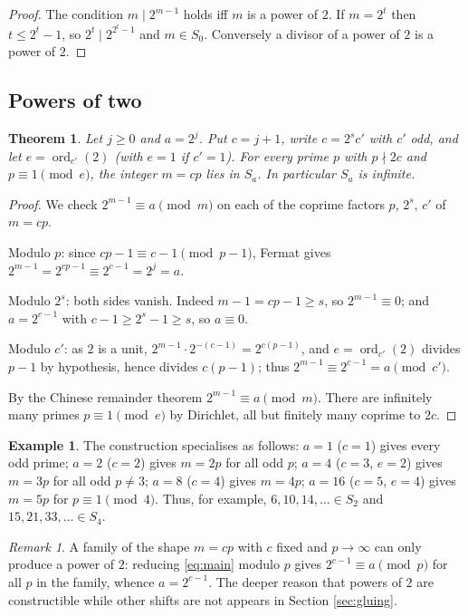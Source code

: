 \documentclass[11pt,reqno]{amsart}
\theoremstyle{plain}
\newtheorem{theorem}{Theorem}
\theoremstyle{definition}
\newtheorem{example}{Example}
\theoremstyle{remark}
\newtheorem{remark}{Remark}
\newcommand{\ord}{\operatorname{ord}}
\newcommand{\dvd}{\mid}
\newcommand{\Sa}{S_a}
\begin{document}
\begin{proof}
The condition $m\dvd 2^{m-1}$ holds iff $m$ is a power of $2$. If $m=2^{t}$ then $t\le 2^{t}-1$, so $2^{t}\dvd2^{2^{t}-1}$ and $m\in S_0$. Conversely a divisor of a power of $2$ is a power of $2$.
\end{proof}

\subsection{Powers of two}

\begin{theorem}\label{thm:powers}
Let $j\ge0$ and $a=2^{j}$. Put $c=j+1$, write $c=2^{s}c'$ with $c'$ odd, and let $e=\ord_{c'}(2)$ (with $e=1$ if $c'=1$). For every prime $p$ with $p\nmid 2c$ and $p\equiv1\pmod e$, the integer $m=cp$ lies in $\Sa$. In particular $\Sa$ is infinite.
\end{theorem}

\begin{proof}
We check $2^{m-1}\equiv a\pmod m$ on each of the coprime factors $p$, $2^{s}$, $c'$ of $m=cp$.

Modulo $p$: since $cp-1\equiv c-1\pmod{p-1}$, Fermat gives $2^{m-1}=2^{cp-1}\equiv2^{c-1}=2^{j}=a$.

Modulo $2^{s}$: both sides vanish. Indeed $m-1=cp-1\ge s$, so $2^{m-1}\equiv0$; and $a=2^{c-1}$ with $c-1\ge 2^{s}-1\ge s$, so $a\equiv0$.

Modulo $c'$: as $2$ is a unit, $2^{m-1}\cdot 2^{-(c-1)}=2^{c(p-1)}$, and $e=\ord_{c'}(2)$ divides $p-1$ by hypothesis, hence divides $c(p-1)$; thus $2^{m-1}\equiv2^{c-1}=a\pmod{c'}$.

By the Chinese remainder theorem $2^{m-1}\equiv a\pmod m$. There are infinitely many primes $p\equiv1\pmod e$ by Dirichlet, all but finitely many coprime to $2c$.
\end{proof}

\begin{example}
The construction specialises as follows: $a=1$ ($c=1$) gives every odd prime; $a=2$ ($c=2$) gives $m=2p$ for all odd $p$; $a=4$ ($c=3$, $e=2$) gives $m=3p$ for all odd $p\ne3$; $a=8$ ($c=4$) gives $m=4p$; $a=16$ ($c=5$, $e=4$) gives $m=5p$ for $p\equiv1\pmod4$. Thus, for example, $6,10,14,\dots\in S_2$ and $15,21,33,\dots\in S_4$.
\end{example}

\begin{remark}\label{rem:onlypowers}
A family of the shape $m=cp$ with $c$ fixed and $p\to\infty$ can only produce a power of $2$: reducing \eqref{eq:main} modulo $p$ gives $2^{c-1}\equiv a\pmod p$ for all $p$ in the family, whence $a=2^{c-1}$. The deeper reason that powers of $2$ are constructible while other shifts are not appears in Section \ref{sec:gluing}.
\end{remark}
\end{document}
